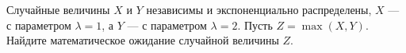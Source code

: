 \documentclass{article}
\begin{document}
Случайные величины $X$ и $Y$ независимы и экспоненциально распределены, $X$ --- с параметром $\lambda = 1$, а $Y$ --- с параметром $\lambda = 2$.
Пусть $Z = \max (X, Y)$. Найдите математическое ожидание случайной величины $Z$.
\end{document}
